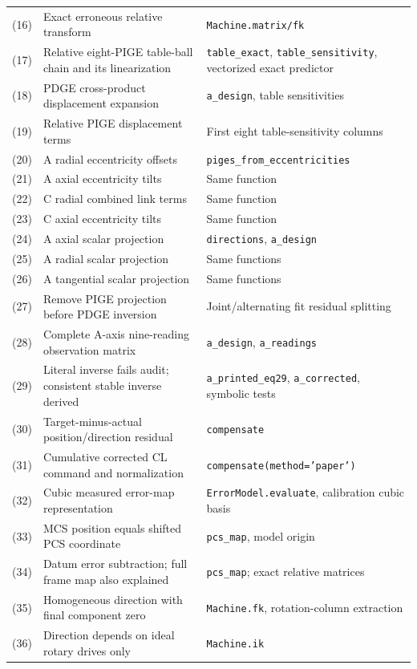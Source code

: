 {\begin{longtable}{p{.11\linewidth}p{.42\linewidth}p{.37\linewidth}}
(16) & Exact erroneous relative transform & \texttt{Machine.matrix/fk} \\
(17) & Relative eight-PIGE table-ball chain and its linearization & \texttt{table\_exact}, \texttt{table\_sensitivity}, vectorized exact predictor \\
(18) & PDGE cross-product displacement expansion & \texttt{a\_design}, table sensitivities \\
(19) & Relative PIGE displacement terms & First eight table-sensitivity columns \\
(20) & A radial eccentricity offsets & \texttt{piges\_from\_eccentricities} \\
(21) & A axial eccentricity tilts & Same function \\
(22) & C radial combined link terms & Same function \\
(23) & C axial eccentricity tilts & Same function \\
(24) & A axial scalar projection & \texttt{directions}, \texttt{a\_design} \\
(25) & A radial scalar projection & Same functions \\
(26) & A tangential scalar projection & Same functions \\
(27) & Remove PIGE projection before PDGE inversion & Joint/alternating fit residual splitting \\
(28) & Complete A-axis nine-reading observation matrix & \texttt{a\_design}, \texttt{a\_readings} \\
(29) & Literal inverse fails audit; consistent stable inverse derived & \texttt{a\_printed\_eq29}, \texttt{a\_corrected}, symbolic tests \\
(30) & Target-minus-actual position/direction residual & \texttt{compensate} \\
(31) & Cumulative corrected CL command and normalization & \texttt{compensate(method='paper')} \\
(32) & Cubic measured error-map representation & \texttt{ErrorModel.evaluate}, calibration cubic basis \\
(33) & MCS position equals shifted PCS coordinate & \texttt{pcs\_map}, model origin \\
(34) & Datum error subtraction; full frame map also explained & \texttt{pcs\_map}; exact relative matrices \\
(35) & Homogeneous direction with final component zero & \texttt{Machine.fk}, rotation-column extraction \\
(36) & Direction depends on ideal rotary drives only & \texttt{Machine.ik} \\

\end{longtable}}

